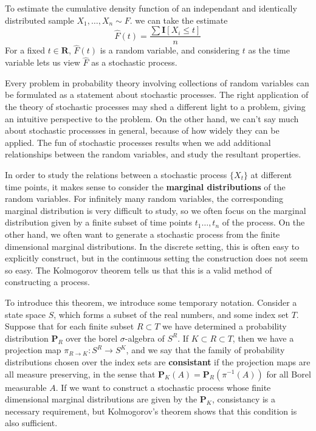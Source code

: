 \begin{example}
    To estimate the cumulative density function of an independant and identically distributed sample $X_1, \dots, X_n \sim F$. we can take the estimate
    \[ \hat{F}(t) = \frac{\sum \mathbf{I}[X_i \leq t]}{n} \]
    For a fixed $t \in \mathbf{R}$, $\hat{F}(t)$ is a random variable, and considering $t$ as the time variable lets us view $\hat{F}$ as a stochastic process.
\end{example}

Every problem in probability theory involving collections of random variables can be formulated as a statement about stochastic processes. The right application of the theory of stochastic processes may shed a different light to a problem, giving an intuitive perspective to the problem. On the other hand, we can't say much about stochastic processses in general, because of how widely they can be applied. The fun of stochastic processes results when we add additional relationships between the random variables, and study the resultant properties.

In order to study the relations between a stochastic process $\{ X_t \}$ at different time points, it makes sense to consider the {\bf marginal distributions} of the random variables. For infinitely many random variables, the corresponding marginal distribution is very difficult to study, so we often focus on the marginal distribution given by a finite subset of time points $t_1 \dots, t_n$ of the process. On the other hand, we often want to generate a stochastic process from the finite dimensional marginal distributions. In the discrete setting, this is often easy to explicitly construct, but in the continuous setting the construction does not seem so easy. The Kolmogorov theorem tells us that this is a valid method of constructing a process.

To introduce this theorem, we introduce some temporary notation. Consider a state space $S$, which forms a subset of the real numbers, and some index set $T$. Suppose that for each finite subset $R \subset T$ we have determined a probability distribution $\mathbf{P}_R$ over the borel $\sigma$-algebra of $S^R$. If $K \subset R \subset T$, then we have a projection map $\pi_{R \to K}: S^R \to S^K$, and we say that the family of probability distributions chosen over the index sets are {\bf consistant} if the projection maps are all measure preserving, in the sense that $\mathbf{P}_K(A) = \mathbf{P}_R(\pi^{-1}(A))$ for all Borel measurable $A$. If we want to construct a stochastic process whose finite dimensional marginal distributions are given by the $\mathbf{P}_K$, consistancy is a necessary requirement, but Kolmogorov's theorem shows that this condition is also sufficient.

